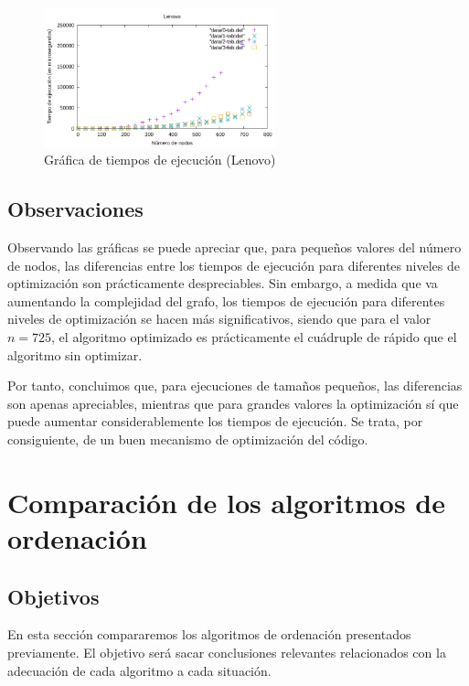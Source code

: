 \documentclass{homework}
\begin{document}
    \begin{figure}[h]
        \centering
        \includegraphics[width=0.6\textwidth]{../data/lenovo-opt.pdf}
        \caption{Gráfica de tiempos de ejecución (Lenovo)}
    \end{figure}

    \subsection{Observaciones}

    Observando las gráficas se puede apreciar que, para pequeños valores del número de nodos, las diferencias entre los
    tiempos de ejecución para diferentes niveles de optimización son prácticamente despreciables. Sin embargo, a medida
    que va aumentando la complejidad del grafo, los tiempos de ejecución para diferentes niveles de optimización se hacen
    más significativos, siendo que para el valor $n=725$, el algoritmo optimizado es prácticamente el cuádruple de rápido que
    el algoritmo sin optimizar. 

    Por tanto, concluimos que, para ejecuciones de tamaños pequeños, las diferencias son apenas apreciables, mientras que
    para grandes valores la optimización sí que puede aumentar considerablemente los tiempos de ejecución. Se trata, por
    consiguiente, de un buen mecanismo de optimización del código. 


    \section{Comparación de los algoritmos de ordenación}

    \subsection{Objetivos}

    En esta sección compararemos los algoritmos de ordenación presentados previamente. El objetivo será
    sacar conclusiones relevantes relacionados con la adecuación de cada algoritmo a cada situación. 
\end{document}
